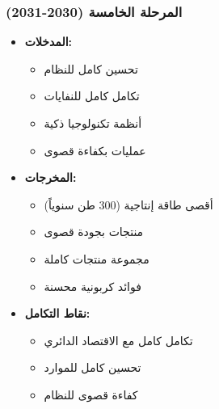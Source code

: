 \subsubsection{المرحلة الخامسة (2030-2031)}
\begin{itemize}
    \item \textbf{المدخلات:}
    \begin{itemize}
        \item تحسين كامل للنظام
        \item تكامل كامل للنفايات
        \item أنظمة تكنولوجيا ذكية
        \item عمليات بكفاءة قصوى
    \end{itemize}
    \item \textbf{المخرجات:}
    \begin{itemize}
        \item أقصى طاقة إنتاجية (300 طن سنوياً)
        \item منتجات بجودة قصوى
        \item مجموعة منتجات كاملة
        \item فوائد كربونية محسنة
    \end{itemize}
    \item \textbf{نقاط التكامل:}
    \begin{itemize}
        \item تكامل كامل مع الاقتصاد الدائري
        \item تحسين كامل للموارد
        \item كفاءة قصوى للنظام
    \end{itemize}
\end{itemize}

